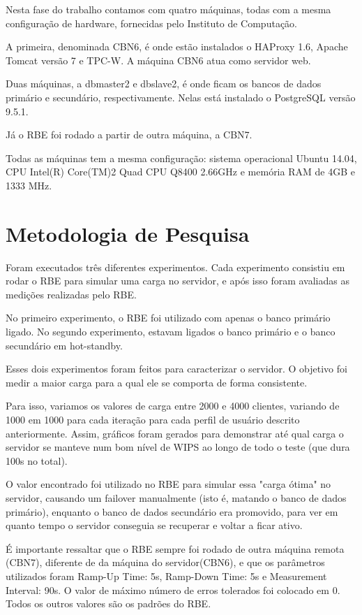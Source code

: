 \documentclass[11pt,twoside]{article}
\begin{document}
     Nesta fase do trabalho contamos com quatro máquinas, todas com a mesma configuração de hardware, fornecidas pelo Instituto de Computação.

     A primeira, denominada CBN6, é onde estão instalados o HAProxy 1.6, Apache Tomcat versão 7 e TPC-W. A máquina CBN6 atua como servidor web.

     Duas máquinas, a dbmaster2 e dbslave2, é onde ficam os bancos de dados primário e secundário, respectivamente. Nelas está instalado o PostgreSQL vers\~ao 9.5.1.

     Já o RBE foi rodado a partir de outra máquina, a CBN7.

     Todas as máquinas tem a mesma configuração: sistema operacional Ubuntu 14.04, CPU Intel(R) Core(TM)2 Quad CPU Q8400 2.66GHz e mem\'oria RAM de 4GB e 1333 MHz.

\section{Metodologia de Pesquisa}
\setlength{\parindent}{4ex}
Foram executados três diferentes experimentos. Cada experimento consistiu em rodar o RBE para simular uma carga no servidor, e após isso foram avaliadas as medições realizadas pelo RBE.

No primeiro experimento, o RBE foi utilizado com apenas o banco primário ligado. No segundo experimento, estavam ligados o banco primário e o banco secundário em hot-standby.

Esses dois experimentos foram feitos para caracterizar o servidor. O objetivo foi medir a maior carga para a qual ele se comporta de forma consistente.

Para isso, variamos os valores de carga entre 2000 e 4000 clientes, variando de 1000 em 1000 para cada iteração para cada perfil de usuário descrito anteriormente. Assim,  gráficos foram gerados para demonstrar até qual carga o servidor se manteve num bom nível de WIPS ao longo de todo o teste (que dura 100s no total).

O valor encontrado foi utilizado no RBE para simular essa "carga ótima" no servidor, causando um failover manualmente (isto é, matando o banco de dados primário), enquanto o banco de dados secundário era promovido, para ver em quanto tempo o servidor conseguia se recuperar e voltar a ficar ativo.

É importante ressaltar que o RBE sempre foi rodado de outra máquina remota (CBN7), diferente de da máquina do servidor(CBN6), e que os parâmetros utilizados foram Ramp-Up Time: 5s, Ramp-Down Time: 5s e Measurement Interval: 90s. O valor de máximo número de erros tolerados foi colocado em 0. Todos os outros valores são os padrões do RBE.
\end{document}
